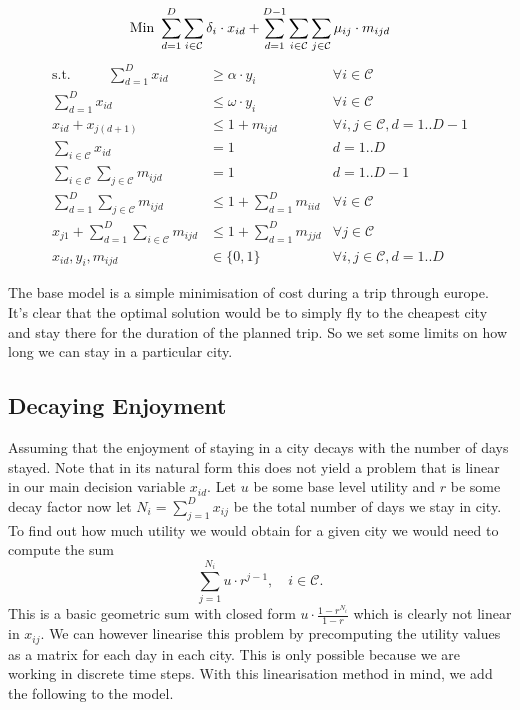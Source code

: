 \documentclass[12pt]{article}
\begin{document}
\begin{equation*}
\text{Min } \sum_{d=1}^{D} \sum_{i \in \mathcal{C}} \delta_{i} \cdot x_{id} + \sum_{d=1}^{D-1} \sum_{i \in \mathcal{C}} \sum_{j \in \mathcal{C}} \mu_{ij} \cdot m_{ijd}\\
\end{equation*}
\begin{align}
\text{s.t.~~~~~~~~} \sum_{d=1}^{D} x_{id} & \geq \alpha \cdot y_{i} & \forall i \in \mathcal{C}\\
\sum_{d=1}^{D} x_{id} & \leq \omega \cdot y_{i} &  \forall i \in \mathcal{C}\\
x_{id} + x_{j(d+1)} & \leq 1 + m_{ijd} & \forall i,j \in \mathcal{C}, d = 1..D-1 \\
\sum_{i \in \mathcal{C}} x_{id} &= 1 & d = 1..D \\
\sum_{i \in \mathcal{C}} \sum_{j \in \mathcal{C}} m_{ijd} &= 1 & d = 1..D-1 \\
\sum_{d=1}^{D} \sum_{j \in \mathcal{C}} m_{ijd} &\leq 1 + \sum_{d=1}^{D} m_{iid} & \forall i \in \mathcal{C} \\
x_{j1} + \sum_{d=1}^{D} \sum_{i \in \mathcal{C}} m_{ijd} &\leq 1 + \sum_{d=1}^{D} m_{jjd} & \forall j \in \mathcal{C}\\
x_{id}, y_{i}, m_{ijd} & \in \{0,1\} & \forall i, j \in \mathcal{C}, d = 1..D
\end{align}

The base model is a simple minimisation of cost during a trip through europe. It's clear that the optimal solution would be to simply fly to the cheapest city and stay there for the duration of the planned trip. So we set some limits on how long we can stay in a particular city.

\newpage

\subsection{Decaying Enjoyment}
Assuming that the enjoyment of staying in a city decays with the number of days stayed. Note that in its natural form this does not yield a problem that is linear in our main decision variable $x_{id}$. Let $u$ be some base level utility and $r$ be some decay factor now let $N_i=\sum_{j=1}^D x_{ij}$ be the total number of days we stay in city. To find out how much utility we would obtain for a given city we would need to compute the sum
\begin{equation*}
	\sum\limits_{j=1}^{N_{i}} u \cdot r^{j-1}, \quad i \in \mathcal{C}.
\end{equation*}
This is a basic geometric sum with closed form $u \cdot \frac{1-r^{N_i}}{1-r}$ which is clearly not linear in $x_{ij}$. We can however linearise this problem by precomputing the utility values as a matrix for each day in each city. This is only possible because we are working in discrete time steps. With this linearisation method in mind, we add the following to the model.
\end{document}
